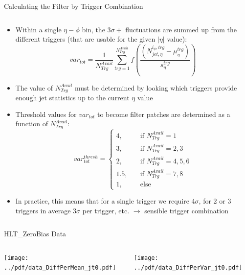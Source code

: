 \documentclass[9pt]{beamer}
\begin{document}
\begin{frame}[t]{Calculating the Filter by Trigger Combination}
\begin{columns}[T]
\begin{column}{\textwidth}
\begin{itemize}
 \item Within a single $\eta-\phi$ bin, the $3\sigma+$ fluctuations are summed up from the different triggers (that are usable for the given $|\eta|$ value):
 \begin{equation}
     var_{tot}= \frac{1}{N_{Trg}^{Avail}}\sum_{trg=1}^{N_{Trg}^{Avail}} f\left(\frac{\left(N_{jet,\eta}^{i_\phi,trg} - \mu_\eta^{trg}\right)}{s_\eta^{trg}}\right)
 \end{equation}
    \item The value of $N_{Trg}^{Avail}$ must be determined by looking which triggers provide enough jet statistics up to the current $\eta$ value
    \item Threshold values for $var_{tot}$ to become filter patches are determined as a function of $N_{Trg}^{Avail}$:
        \begin{equation}
            var_{tot}^{thresh} =
     \begin{cases}
       4, &\quad\text{if } N_{Trg}^{Avail} = 1\\
       3, &\quad\text{if } N_{Trg}^{Avail} = 2,3\\
       2, &\quad\text{if } N_{Trg}^{Avail} = 4,5,6\\
       1.5, &\quad\text{if } N_{Trg}^{Avail} = 7,8\\
       1, &\quad\text{else}
     \end{cases}
        \end{equation}
    \item In practice, this means that for a single trigger we require $4\sigma$, for 2 or 3 triggers in average $3\sigma$ per trigger, etc. $\rightarrow$ sensible trigger combination
\end{itemize}
\end{column}
\end{columns}
\end{frame}

\begin{frame}[t]{HLT\_ZeroBias Data}
\begin{columns}[T]
  \begin{column}{.5\textwidth}
  \texttt{[image: ../pdf/data\_DiffPerMean\_jt0.pdf]}
  \end{column}
  \begin{column}{.5\textwidth}
  \texttt{[image: ../pdf/data\_DiffPerVar\_jt0.pdf]}
  \end{column}
\end{columns}
\end{frame}
\end{document}
